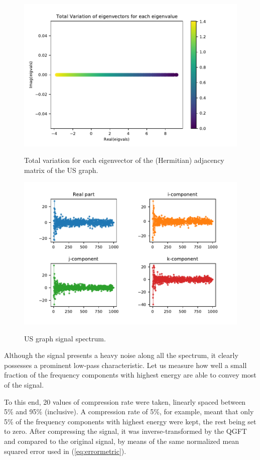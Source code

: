 \renewcommand{\floatpagefraction}{.8}%
\begin{figure}
    \centering
    \caption{Total variation for each eigenvector of the (Hermitian) adjacency matrix of the US graph.}
    \includegraphics[width=0.65\linewidth]{Figures/usa_example/us_counties_qgsp_tv1.pdf}
    \floatsource
    \label{fig:us_counties_qgsp_tv1}
\end{figure}

\begin{figure}
    \centering
    \caption{US graph signal spectrum.}
    \includegraphics[width=0.95\linewidth]{Figures/usa_example/us_counties_qgsp_spectrumsig.pdf}
    \floatsource
    \label{fig:us_counties_qgsp_spectrumsig}
\end{figure}

Although the signal presents a heavy noise along all the spectrum, it clearly possesses a prominent low-pass characteristic. Let us measure how well a small fraction of the frequency components with highest energy are able to convey most of the signal.

To this end, 20 values of compression rate were taken, linearly spaced between 5\% and 95\% (inclusive). A compression rate of 5\%, for example, meant that only 5\% of the frequency components with highest energy were kept, the rest being set to zero. After compressing the signal, it was inverse-transformed by the QGFT and compared to the original signal, by means of the same normalized mean squared error used in (\ref{eq:errormetric}).

